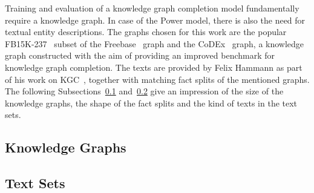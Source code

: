 Training and evaluation of a knowledge graph completion model fundamentally require a knowledge graph. In case of the Power model, there is also the need for textual entity descriptions. The graphs chosen for this work are the popular FB15K-237~\cite{Toutanova2015ObservedVL} subset of the  Freebase~\cite{Bollacker2008FreebaseAC} graph and the CoDEx~\cite{Safavi2020CoDExAC} graph, a knowledge graph constructed with the aim of providing an improved benchmark for knowledge graph completion. The texts are provided by Felix Hammann as part of his work on KGC~\cite{}, together with matching fact splits of the mentioned graphs. The following Subsections~\ref{subsec:5_experiments/1_base_datasets/1_knowledge_graphs} and~\ref{subsec:5_experiments/1_base_datasets/2_text_sets} give an impression of the size of the knowledge graphs, the shape of the fact splits and the kind of texts in the text sets.

\subsection{Knowledge Graphs}
\label{subsec:5_experiments/1_base_datasets/1_knowledge_graphs}


\subsection{Text Sets}
\label{subsec:5_experiments/1_base_datasets/2_text_sets}

